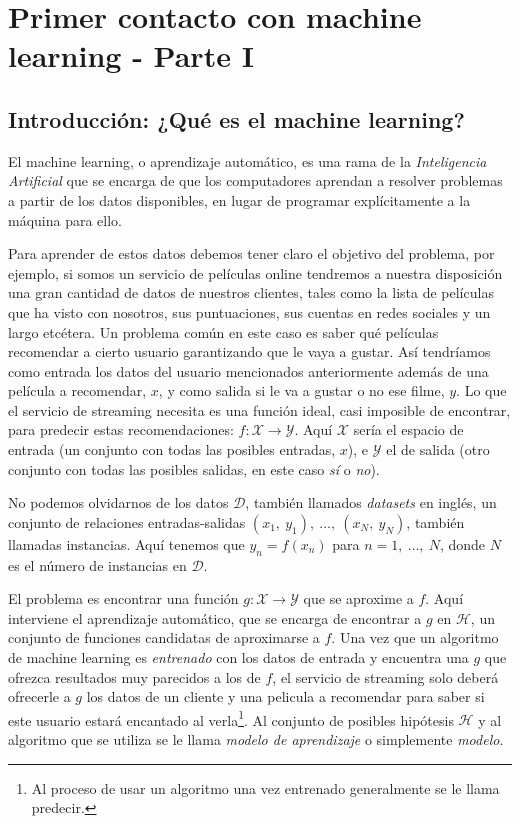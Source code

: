 \chapter{Primer contacto con machine learning - Parte I} \label{chap:2}

\vspace*{5mm}

\section{Introducción: ¿Qué es el machine learning?} \label{sec:2.1}

El machine learning, o aprendizaje automático, es una rama de la \emph{Inteligencia Artificial} que se encarga de que los computadores aprendan a resolver problemas a partir de los datos disponibles, en lugar de programar explícitamente a la máquina para ello.

Para aprender de estos datos debemos tener claro el objetivo del problema, por ejemplo, si somos un servicio de películas online tendremos a nuestra disposición una gran cantidad de datos de nuestros clientes, tales como la lista de películas que ha visto con nosotros, sus puntuaciones, sus cuentas en redes sociales y un largo etcétera. Un problema común en este caso es saber qué películas recomendar a cierto usuario garantizando que le vaya a gustar. Así tendríamos como entrada los datos del usuario mencionados anteriormente además de una película a recomendar, $x$, y como salida si le va a gustar o no ese filme, $y$. Lo que el servicio de streaming necesita es una función ideal, casi imposible de encontrar, para predecir estas recomendaciones: $f: \mathcal{X} \rightarrow \mathcal{Y}$. Aquí $\mathcal{X}$ sería el espacio de entrada (un conjunto con todas las posibles entradas, $x$), e $\mathcal{Y}$ el de salida (otro conjunto con todas las posibles salidas, en este caso \emph{sí} o \emph{no}).

No podemos olvidarnos de los datos $\mathcal{D}$, también llamados \emph{datasets} en inglés, un conjunto de relaciones entradas-salidas $(x_{1},\:y_{1}),\:\dots,\:(x_{N},\:y_{N})$, también llamadas instancias. Aquí tenemos que $y_{n} = f(x_{n})$ para $n = 1,\:\dots,\:N$, donde $N$ es el número de instancias en $\mathcal{D}$.

El problema es encontrar una función $g: \mathcal{X} \rightarrow \mathcal{Y}$ que se aproxime a $f$. Aquí interviene el aprendizaje automático, que se encarga de encontrar a $g$ en $\mathcal{H}$, un conjunto de funciones candidatas de aproximarse a $f$. Una vez que un algoritmo de machine learning es \emph{entrenado} con los datos de entrada y encuentra una $g$ que ofrezca resultados muy parecidos a los de $f$, el servicio de streaming solo deberá ofrecerle a $g$ los datos de un cliente y una pelicula a recomendar para saber si este usuario estará encantado al verla\footnote{Al proceso de usar un algoritmo una vez entrenado generalmente se le llama predecir.}. Al conjunto de posibles hipótesis $\mathcal{H}$ y al algoritmo que se utiliza se le llama \emph{modelo de aprendizaje} o simplemente \emph{modelo}.

